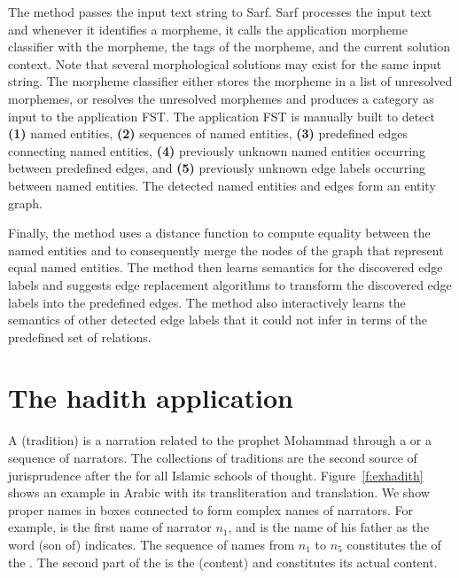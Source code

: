 \documentclass{llncs}
\newcommand{\noArRL}[1]{\arabfalse\RL{#1}\arabtrue}
\newcommand{\noTrRL}[1]{\transfalse\RL{#1}\transtrue}
\begin{document}
The method passes the input text string to Sarf.
Sarf processes the input text and whenever
it identifies a morpheme, it calls the application morpheme
classifier with the morpheme, the tags of the morpheme, 
and the current solution context.
Note that several morphological solutions may exist for the same
input string.
The morpheme classifier either stores the morpheme in a list of
unresolved morphemes, 
or resolves the unresolved morphemes and produces
a category as input to the application FST.
The application FST is manually built to
detect {\bf (1)} named entities,  
{\bf (2)} sequences of named entities,  
{\bf (3)} predefined edges connecting named entities, 
{\bf (4)} previously unknown named entities occurring between predefined edges, 
and {\bf (5)} previously unknown edge labels occurring between named entities.
The detected named entities and edges form an entity graph.

Finally, the method uses a distance
function to compute equality between the named entities and
to consequently merge the nodes of the graph that represent 
equal named entities.
The method then learns semantics for the discovered edge labels 
and suggests edge replacement algorithms to transform the 
discovered edge labels into the predefined edges. 
The method also interactively learns the semantics of other 
detected edge labels that it could not infer 
in terms of the predefined set of relations.



\section{The hadith application}
A  (tradition) 
is a narration related to the prophet Mohammad
through a  or a sequence of narrators. 
The collections of traditions are the second source of
jurisprudence after the  for all Islamic 
schools of thought. 
Figure~\ref{f:exhadith} shows an example \noArRL{.hady_t} in 
Arabic with its transliteration and translation. 
We show proper names in boxes connected
to form complex names of narrators. 
For example, 
\novocalize
\noTrRL{qtybT} is the first name 
of narrator $n_1$, and 
\noTrRL{s`yd} is the name of his father as 
the word \noTrRL{bn} (son of) indicates. 
The sequence of names from $n_1$ to $n_5$ 
constitutes the \noArRL{sanad} 
of the \noArRL{.hady_t}. 
The second part of the \noArRL{.hady_t} is the 
 (content) and constitutes its actual content.
\end{document}
